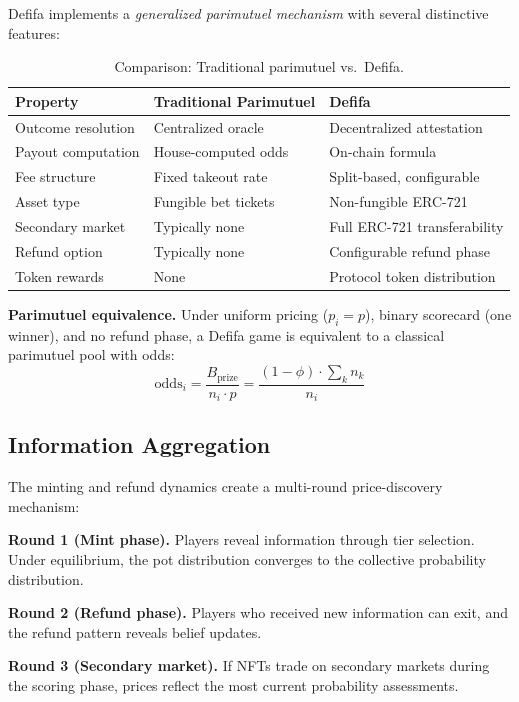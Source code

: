 \documentclass[11pt,a4paper]{article}
\begin{document}
Defifa implements a \emph{generalized parimutuel mechanism} with several distinctive features:

\begin{table}[H]
\centering
\begin{tabular}{lll}
\toprule
\textbf{Property} & \textbf{Traditional Parimutuel} & \textbf{Defifa} \\
\midrule
Outcome resolution & Centralized oracle & Decentralized attestation \\
Payout computation & House-computed odds & On-chain formula \\
Fee structure & Fixed takeout rate & Split-based, configurable \\
Asset type & Fungible bet tickets & Non-fungible ERC-721 \\
Secondary market & Typically none & Full ERC-721 transferability \\
Refund option & Typically none & Configurable refund phase \\
Token rewards & None & Protocol token distribution \\
\bottomrule
\end{tabular}
\caption{Comparison: Traditional parimutuel vs.\ Defifa.}
\end{table}

\textbf{Parimutuel equivalence.} Under uniform pricing ($p_i = p$), binary scorecard (one winner), and no refund phase, a Defifa game is equivalent to a classical parimutuel pool with odds:
\begin{equation}
\text{odds}_i = \frac{B_{\text{prize}}}{n_i \cdot p} = \frac{(1 - \phi) \cdot \sum_k n_k}{n_i}
\end{equation}

\subsection{Information Aggregation}

The minting and refund dynamics create a multi-round price-discovery mechanism:

\textbf{Round 1 (Mint phase).} Players reveal information through tier selection. Under equilibrium, the pot distribution converges to the collective probability distribution.

\textbf{Round 2 (Refund phase).} Players who received new information can exit, and the refund pattern reveals belief updates.

\textbf{Round 3 (Secondary market).} If NFTs trade on secondary markets during the scoring phase, prices reflect the most current probability assessments.
\end{document}

